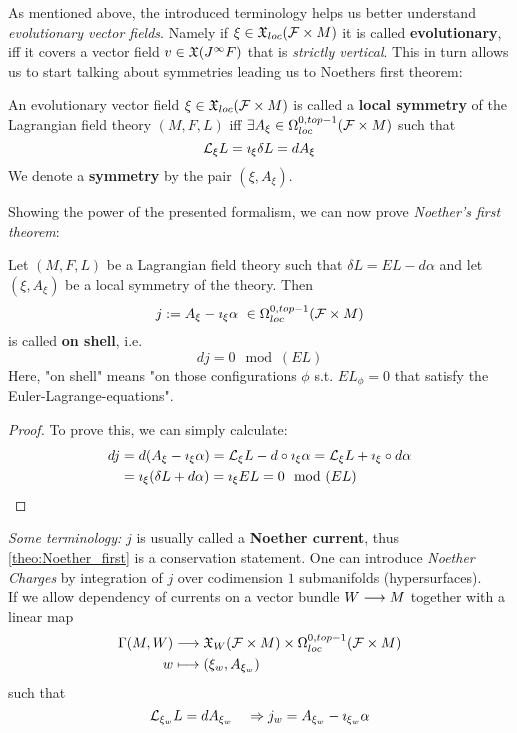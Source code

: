 As mentioned above, the introduced terminology helps us better understand \emph{evolutionary vector fields}. Namely if $\xi \in \mathfrak{X}_{loc}({\mathcal{F}} \times M)$ it is called \textbf{evolutionary}, iff it covers a vector field $v\in \mathfrak{X}(J^\infty F)$ that is \emph{strictly vertical}. This in turn allows us to start talking about symmetries leading us to   Noethers first theorem:

\begin{definition}
\label{def:LocalSymmetry}
  An evolutionary vector field $\xi \in \mathfrak{X}_{loc}({\mathcal{F}} \times M)$ is called a \textbf{local symmetry} of the Lagrangian field theory $(M,F,L)$ iff $\exists A_\xi \in \Omega^{0,top-1}_{loc}({\mathcal{F}}\times M)$ such that
  $$ \mathcal{L}_{\xi} L = \imath_\xi \delta L = dA_\xi $$
  We denote a \textbf{symmetry} by the pair $(\xi, A_\xi)$.
\end{definition}

Showing the power of the presented formalism, we can now prove \emph{Noether's first theorem}:

\begin{theo}
\label{theo:Noether_first}
  Let $(M,F,L)$ be a Lagrangian field theory such that $\delta L = EL - d \alpha$ and let $(\xi, A_\xi)$ be a local symmetry of the theory. Then
  $$ j := A_\xi - \imath_\xi \alpha \ \in \Omega^{0,top-1}_{loc}({\mathcal{F}}\times M) $$
  is called \textbf{on shell}, i.e.
  $$d j = 0 \mod(EL)$$
  Here, "on shell" means "on those configurations $\phi$ s.t. $EL_\phi = 0$ that satisfy the Euler-Lagrange-equations".
\begin{proof}
  To prove this, we can simply calculate:
  \begin{align}
    d j &= d(A_\xi - \imath_\xi \alpha) = \mathcal{L}_{\xi} L - d \circ \imath_\xi \alpha = \mathcal{L}_{\xi} L + \imath_\xi \circ d \alpha\\
    &= \imath_\xi (\delta L + d \alpha) = \imath_\xi EL = 0 \mod(EL)
  \end{align}
\end{proof}
\end{theo}

\emph{Some terminology:} $j$ is usually called a \textbf{Noether current}, thus \ref{theo:Noether_first} is a conservation statement. One can introduce \emph{Noether Charges} by integration of $j$ over codimension $1$ submanifolds (hypersurfaces).\\

If we allow dependency of currents on a vector bundle $W\longrightarrow M$ together with a linear map
\begin{align}
  \Gamma(M,W) &\longrightarrow \mathfrak{X}_{W}({\mathcal{F}}\times M) \times \Omega^{0,top-1}_{loc}({\mathcal{F}}\times M)\\
  w &\longmapsto (\xi_w, A_{\xi_w})
\end{align}
such that
$$\mathcal{L}_{\xi_w}L = dA_{\xi_w} \quad \Rightarrow j_w = A_{\xi_w} - \imath_{\xi_w} \alpha$$

